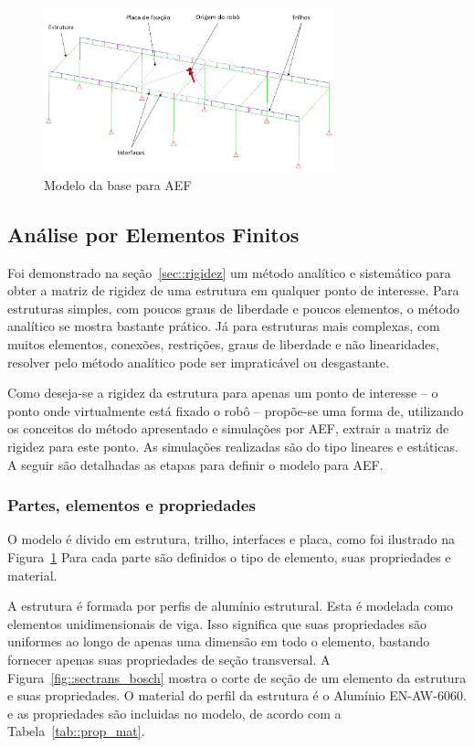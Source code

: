 \begin{figure}[h]
	\centering 
 	\includegraphics[width=0.75\textwidth]{figs/estrutFEA}
 	\caption{Modelo da base para AEF}
 	\label{fig::estrutFEA}
\end{figure}

\subsection{Análise por Elementos Finitos} \label{sec::aef}

Foi demonstrado na seção~\ref{sec::rigidez} um método analítico e sistemático
para obter a matriz de rigidez de uma estrutura em qualquer ponto de
interesse. Para estruturas simples, com poucos graus de liberdade e poucos
elementos, o método analítico se mostra bastante prático. Já para estruturas
mais complexas, com muitos elementos, conexões, restrições, graus de liberdade
e não linearidades, resolver pelo método analítico pode ser impraticável ou
desgastante.

Como deseja-se a rigidez da estrutura para apenas um ponto de interesse -- o
ponto onde virtualmente está fixado o robô -- propõe-se uma forma de, utilizando
os conceitos do método apresentado e simulações por AEF, extrair a matriz de
rigidez para este ponto. As simulações realizadas são do tipo lineares e
estáticas. A seguir são detalhadas as etapas para definir o modelo para AEF.

\subsubsection{Partes, elementos e propriedades}

O modelo é divido em estrutura, trilho, interfaces e placa, como foi ilustrado
na Figura~\ref{fig::estrutFEA} Para cada parte são definidos o tipo de elemento,
suas propriedades e material.

A estrutura é formada por perfis de alumínio estrutural. Esta é modelada como
elementos unidimensionais de viga. Isso significa que suas propriedades são
uniformes ao longo de apenas uma dimensão em todo o elemento, bastando fornecer
apenas suas propriedades de seção transversal. A
Figura~\ref{fig::sectrans_bosch} mostra o corte de seção de um elemento da
estrutura e suas propriedades. O material do perfil da estrutura é o Alumínio
EN-AW-6060. e as propriedades são incluidas no modelo, de acordo com a
Tabela~\ref{tab::prop_mat}.

